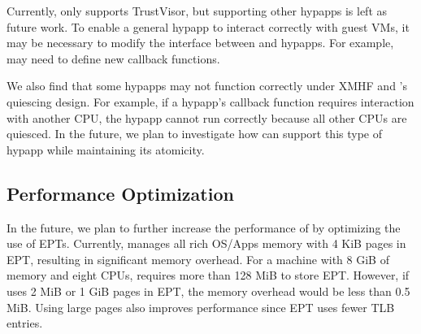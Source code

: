 Currently,  only supports TrustVisor, but supporting other hypapps is left as future work. To enable a general hypapp to interact correctly with guest VMs, it may be necessary to modify the interface between  and hypapps. For example,  may need to define new callback functions.

We also find that some hypapps may not function correctly under XMHF and 's quiescing design. For example, if a hypapp's callback function requires interaction with another CPU, the hypapp cannot run correctly because all other CPUs are quiesced. In the future, we plan to investigate how  can support this type of hypapp while maintaining its atomicity.

\subsection{Performance Optimization}

In the future, we plan to further increase the performance of  by optimizing the use of EPTs. Currently,  manages all rich OS/Apps memory with 4 KiB pages in EPT, resulting in significant memory overhead. For a machine with 8 GiB of memory and eight CPUs,  requires more than 128 MiB to store EPT. However, if  uses 2 MiB or 1 GiB pages in EPT, the memory overhead would be less than 0.5 MiB. Using large pages also improves performance since EPT uses fewer TLB entries.

